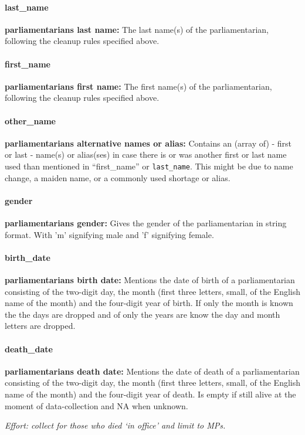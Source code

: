 \documentclass{article}
\begin{document}
\paragraph{last\_name}
    \textbf{parliamentarians last name:} The last name(s) of the parliamentarian, following the cleanup rules specified above.
        
\paragraph{first\_name}
    \textbf{parliamentarians first name:} The first name(s) of the parliamentarian, following the cleanup rules specified above.  
       
\paragraph{other\_name}
    \textbf{parliamentarians alternative names or alias:} Contains an (array of) - first or last - name(s) or alias(ses) in case there is or was another first or last name used than mentioned in ``first\_name'' or \texttt{last\_name}. This might be due to name change, a maiden name, or a commonly used shortage or alias.

\paragraph{gender} 
    \textbf{parliamentarians gender:} Gives the gender of the parliamentarian in string format. With 'm' signifying male and 'f' signifying female.

\paragraph{birth\_date}
 \textbf{parliamentarians birth date:} Mentions the date of birth of a parliamentarian consisting of the two-digit day, the month (first three letters, small, of the English name of the month) and the four-digit year of birth. If only the month is known the the days are dropped and of only the years are know the day and month letters are dropped.

\paragraph{death\_date}
    \textbf{parliamentarians death date:} Mentions the date of death of a parliamentarian consisting of the two-digit day, the month (first three letters, small, of the English name of the month) and the four-digit year of death. Is empty if still alive at the moment of data-collection and NA when unknown.
    \par\textit{Effort: collect for those who died `in office' and limit to MPs.}
\end{document}
